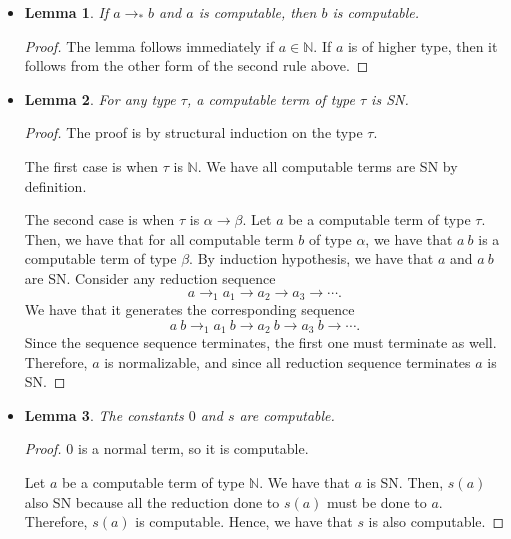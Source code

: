 \documentclass[10pt]{article}
\newtheorem{lemma}{Lemma}[section]
\begin{document}
\begin{itemize}
      \item \begin{lemma}
        If $a \rightarrow_* b$ and $a$ is computable, then $b$ is computable.
      \end{lemma}
      \begin{proof}
        The lemma follows immediately if $a \in \mathbb{N}$. If $a$ is of higher type,
        then it follows from the other form of the second rule above.
      \end{proof}
      
      \item \begin{lemma}
        For any type $\tau$, a computable term of type $\tau$ is SN.
      \end{lemma}
      
      \begin{proof}
        The proof is by structural induction on the type $\tau$.
        
        The first case is when $\tau$ is $\mathbb{N}$. We have all computable terms are SN by definition.
        
        The second case is when $\tau$ is $\alpha \rightarrow \beta$. Let $a$ be a computable term
        of type $\tau$. Then, we have that for all computable term $b$ of type $\alpha$,
        we have that $a\ b$ is a computable term of type $\beta$. By induction hypothesis,
        we have that $a$ and $a\ b$ are SN. Consider any reduction sequence
        $$a \rightarrow_1 a_1 \rightarrow a_2 \rightarrow a_3 \rightarrow \dotsb .$$
        We have that it generates the corresponding sequence
        $$a\ b \rightarrow_1 a_1\ b \rightarrow a_2\ b \rightarrow a_3\ b \rightarrow \dotsb .$$
        Since the sequence sequence terminates, the first one must terminate as well.
        Therefore, $a$ is normalizable, and since all reduction sequence terminates
        $a$ is SN.
      \end{proof}
      
      \item \begin{lemma}
        The constants $0$ and $s$ are computable.
      \end{lemma}
      \begin{proof}
        $0$ is a normal term, so it is computable.
        
        Let $a$ be a computable term of type $\mathbb{N}$.
        We have that $a$ is SN. Then, $s(a)$ also SN because all
        the reduction done to $s(a)$ must be done to $a$.
        Therefore, $s(a)$ is computable. Hence, we have that
        $s$ is also computable.        
      \end{proof}
      

\end{itemize}
\end{document}
